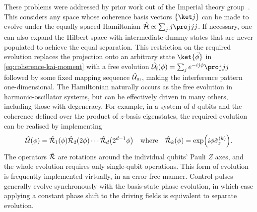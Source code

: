 These problems were addressed by prior work out of the Imperial theory group~\cite{Dive2020}.
This considers any space whose coherence basis vectors $\{\ket j\}$ can be made to evolve under the equally spaced Hamiltonian $\H \propto \sum_j j\proj jj$.
If necessary, one can also expand the Hilbert space with intermediate dummy states that are never populated to achieve the equal separation.
This restriction on the required evolution replaces the projection onto an arbitrary state $\ket{\vec\phi}$ in \cref{eq:coherence-kai-moment} with a free evolution $\U_{\text f}(\phi) = \sum_j e^{-ij\phi}\proj jj$ followed by some fixed mapping sequence $\hat{\mathcal U}_{\text m}$, making the interference pattern one-dimensional.
The Hamiltonian naturally occurs as the free evolution in harmonic-oscillator systems, but can be effectively driven in many others, including those with degeneracy.
For example, in a system of $d$ qubits and the coherence defined over the product of $z$-basis eigenstates, the required evolution can be realised by implementing
\begin{equation}
\hat{\mathcal U}(\phi) = \hat{\mathcal R}_1(\phi)\hat{\mathcal R}_2(2\phi) \dotsb \hat{\mathcal R}_d\bigl(2^{d-1}\phi\bigr)\quad\text{where}\quad\hat{\mathcal R}_k(\phi) = \exp\Bigl(i\phi\hat{\sigma}_{\mkern-1mu z}^{(k)}\Bigr).
\end{equation}
The operators $\hat{\mathcal R}$ are rotations around the individual qubits' Pauli $Z$ axes, and the whole evolution requires only single-qubit operations.
This form of evolution is frequently implemented virtually, in an error-free manner.
Control pulses generally evolve synchronously with the basis-state phase evolution, in which case applying a constant phase shift to the driving fields is equivalent to separate evolution.

